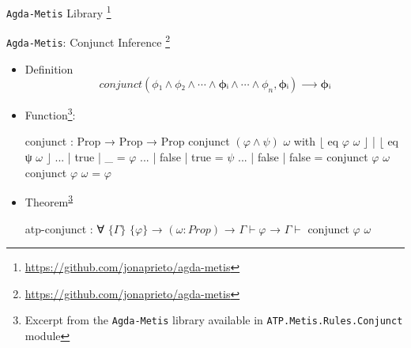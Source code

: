 \documentclass[xetex, hyperref={pdfpagelabels=false}]{beamer}
\begin{document}
\begin{frame}[fragile, label=agda-metis]{\texttt{Agda-Metis} Library
  \footnote{\url{https://github.com/jonaprieto/agda-metis}}}
\vfill
\begin{table}[!ht]
\begin{center}
\end{center}
\label{tab:agda-metis-table}
\end{table}
\vfill
\end{frame}


\begin{frame}[fragile, label=atp-conjunct]{\texttt{Agda-Metis}: Conjunct Inference
  \footnote{\url{https://github.com/jonaprieto/agda-metis}}}
\begin{itemize}
\item Definition
  \begin{equation*}
  conjunct (ϕ₁ ∧  ϕ₂ ∧ ⋯ ∧ \mathbf{ϕᵢ} ∧ ⋯ ∧ \phi_n, \mathbf{ϕᵢ}) ⟶ \mathbf{ϕᵢ}
  \end{equation*}

\item Function\footnote{\label{note-conjunct}Excerpt from the \texttt{Agda-Metis}
library available in  \texttt{ATP.Metis.Rules.Conjunct} module}:
\begin{agda}
conjunct : Prop → Prop → Prop
conjunct $(φ \wedge ψ)$ $ω$ with $⌊$ eq $φ$ $ω$ $⌋$ | $⌊$ eq ψ $ω$ $⌋$
... | true  | _     = $φ$
... | false | true  = $ψ$
... | false | false = conjunct $φ$ $ω$
conjunct $φ$ $ω$       = $φ$
\end{agda}
\item Theorem\textsuperscript{\ref{note-conjunct}}
\begin{agda}
atp-conjunct
  : ∀ $\{Γ\}$ $\{φ\}$
  → $(ω : Prop)$
  → $Γ \vdash φ$
  → $Γ \vdash$ conjunct $φ$ $ω$
\end{agda}
\end{itemize}
\end{frame}
\end{document}
